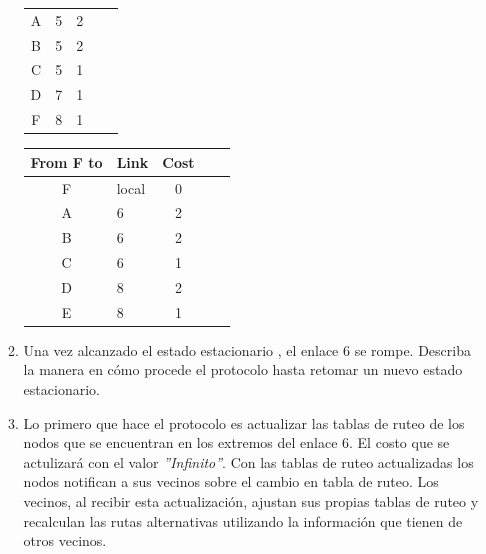\begin{enumerate}
\begin{enumerate}
\begin{table}[H]
\begin{tabular}{@{}clcll@{}}
                A                    & 5                        & 2                    \\
                B                    & 5                        & 2                    \\
                C                    & 5                        & 1                    \\ 
                D                    & 7                        & 1                    \\ 
                F                    & 8                        & 1                    \\ \bottomrule
            \end{tabular}
            \hfill
            \begin{tabular}{@{}clcll@{}}
                \toprule
                From F to            & \multicolumn{1}{c}{Link} & Cost                 \\ \midrule
                F                    & local                    & 0                    \\ 
                A                    & 6                        & 2                    \\
                B                    & 6                        & 2                    \\ 
                C                    & 6                        & 1                    \\
                D                    & 8                        & 2                    \\
                E                    & 8                        & 1                    \\ \bottomrule
            \end{tabular}
        \end{table}

        \item Una vez alcanzado el estado estacionario , el enlace 6 se rompe. Describa la manera en c\'omo procede el protocolo
        hasta retomar un nuevo estado estacionario.
        \item[] Lo primero que hace el protocolo es actualizar las tablas de ruteo de los nodos que se encuentran en los extremos del enlace 6.
        El costo que se actulizar\'a con el valor \textit{''Infinito''}. Con las tablas de ruteo actualizadas los nodos notifican a sus vecinos
        sobre el cambio en tabla de ruteo. Los vecinos, al recibir esta actualizaci\'on, ajustan sus propias tablas de ruteo y recalculan las rutas
        alternativas utilizando la informaci\'on que tienen de otros vecinos.


\end{enumerate}
\end{enumerate}
